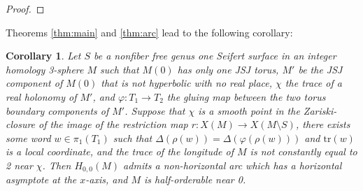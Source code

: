 \documentclass{article}
\theoremstyle{plain}
\theoremstyle{definition}
\theoremstyle{plain}
\theoremstyle{plain}
\newtheorem{corollary}[theorem]{Corollary}
\theoremstyle{plain}
\theoremstyle{remark}
\theoremstyle{remark}
\theoremstyle{plain}
\theoremstyle{plain}
\begin{document}
\begin{proof}
\end{proof}

Theorems \ref{thm:main} and \ref{thm:arc} lead to the following corollary:

\begin{corollary}\label{cor:general}
Let $S$ be a nonfiber free genus one Seifert surface in an integer homology 3-sphere $M$ such that $M(0)$ has only one JSJ torus, $M'$ be the JSJ component of $M(0)$ that is not hyperbolic with no real place, $\chi$ the trace of a real holonomy of $M'$, and $\varphi: T_1 \to T_2$ the gluing map between the two torus boundary components of $M'$. Suppose that $\chi$ is a smooth point in the Zariski-closure of the image of the restriction map $r: X(M) \to X(M \setminus S)$, there exists some word $w \in \pi_1(T_1)$ such that $\Delta(\rho(w)) = \Delta(\varphi(\rho(w)))$ and $\text{tr}(w)$ is a local coordinate, and the trace of the longitude of $M$ is not constantly equal to 2 near $\chi$. Then $H_{0, 0}(M)$ admits a non-horizontal arc which has a horizontal asymptote at the $x$-axis, and $M$ is half-orderable near 0.
\end{corollary}
\end{document}
